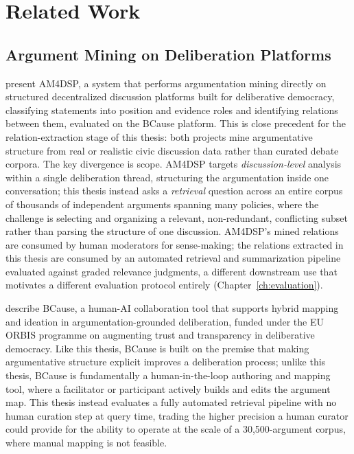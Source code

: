 \chapter{Related Work}
\label{ch:relatedWork}

\section{Argument Mining on Deliberation Platforms}
\label{sec:rw-am-deliberation}

\textcite{elguendouze2025am4dsp} present AM4DSP, a system that performs argumentation mining
directly on structured decentralized discussion platforms built for deliberative democracy,
classifying statements into position and evidence roles and identifying relations between them,
evaluated on the BCause platform. This is close precedent for the relation-extraction stage of
this thesis: both projects mine argumentative structure from real or realistic civic discussion
data rather than curated debate corpora. The key divergence is scope. AM4DSP targets
\emph{discussion-level} analysis within a single deliberation thread, structuring the argumentation
inside one conversation; this thesis instead asks a \emph{retrieval} question across an entire
corpus of thousands of independent arguments spanning many policies, where the challenge is
selecting and organizing a relevant, non-redundant, conflicting subset rather than parsing the
structure of one discussion. AM4DSP's mined relations are consumed by human moderators for
sense-making; the relations extracted in this thesis are consumed by an automated retrieval and
summarization pipeline evaluated against graded relevance judgments, a different downstream use
that motivates a different evaluation protocol entirely (Chapter~\ref{ch:evaluation}).

\textcite{anastasiou2025bcause} describe BCause, a human-AI collaboration tool that supports hybrid
mapping and ideation in argumentation-grounded deliberation, funded under the EU ORBIS programme
on augmenting trust and transparency in deliberative democracy. Like this thesis, BCause is
built on the premise that making argumentative structure explicit improves a deliberation
process; unlike this thesis, BCause is fundamentally a human-in-the-loop authoring and mapping
tool, where a facilitator or participant actively builds and edits the argument map. This thesis
instead evaluates a fully automated retrieval pipeline with no human curation step at query time,
trading the higher precision a human curator could provide for the ability to operate at the
scale of a 30{,}500-argument corpus, where manual mapping is not feasible.

